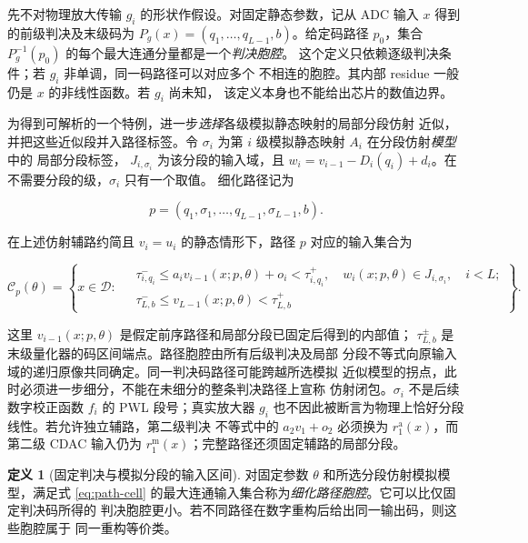 \documentclass[11pt,a4paper]{ctexart}
\theoremstyle{adcplain}
\theoremstyle{definition}
\newtheorem{definition}[proposition]{定义}
\begin{document}
先不对物理放大传输 $g_i$ 的形状作假设。对固定静态参数，记从 ADC 输入 $x$
得到的前级判决及末级码为 $P_g(x)=(q_1,\ldots,q_{L-1},b)$。给定码路径
$p_0$，集合 $P_g^{-1}(p_0)$ 的每个最大连通分量都是一个\emph{判决胞腔}。
这个定义只依赖逐级判决条件；若 $g_i$ 非单调，同一码路径可以对应多个
不相连的胞腔。其内部 residue 一般仍是 $x$ 的非线性函数。若 $g_i$ 尚未知，
该定义本身也不能给出芯片的数值边界。

为得到可解析的一个特例，进一步\emph{选择}各级模拟静态映射的局部分段仿射
近似，并把这些近似段并入路径标签。令
$\sigma_i$ 为第 $i$ 级模拟静态映射 $A_i$ 在分段仿射\emph{模型}中的
局部分段标签，
$J_{i,\sigma_i}$ 为该分段的输入域，且
$w_i=v_{i-1}-D_i(q_i)+d_i$。在不需要分段的级，$\sigma_i$ 只有一个取值。
细化路径记为

\begin{equation}
  p=(q_1,\sigma_1,\ldots,q_{L-1},\sigma_{L-1},b).
\end{equation}

在上述仿射辅路约简且 $v_i=u_i$ 的静态情形下，路径 $p$ 对应的输入集合为

\begin{equation}
  \mathcal C_p(\theta)
  =
  \left\{x\in\mathcal D:\;
  \begin{aligned}
    &\tau_{i,q_i}^{-}\le a_i v_{i-1}(x;p,\theta)+o_i
      <\tau_{i,q_i}^{+},\quad
      w_i(x;p,\theta)\in J_{i,\sigma_i},\quad i<L;\\
    &\tau_{L,b}^{-}\le v_{L-1}(x;p,\theta)<\tau_{L,b}^{+}
  \end{aligned}\right\}.
  \label{eq:path-cell}
\end{equation}

这里 $v_{i-1}(x;p,\theta)$ 是假定前序路径和局部分段已固定后得到的内部值；
$\tau_{L,b}^{\pm}$ 是末级量化器的码区间端点。路径胞腔由所有后级判决及局部
分段不等式向原输入域的递归原像共同确定。同一判决码路径可能跨越所选模拟
近似模型的拐点，此时必须进一步细分，不能在未细分的整条判决路径上宣称
仿射闭包。$\sigma_i$ 不是后续数字校正函数 $f_i$ 的 PWL 段号；真实放大器
$g_i$ 也不因此被断言为物理上恰好分段线性。若允许独立辅路，第二级判决
不等式中的 $a_2v_1+o_2$ 必须换为 $r_1^{\mathrm a}(x)$，而第二级 CDAC
输入仍为 $r_1^{\mathrm m}(x)$；完整路径还须固定辅路的局部分段。

\begin{definition}[固定判决与模拟分段的输入区间]
对固定参数 $\theta$ 和所选分段仿射模拟模型，满足式 \eqref{eq:path-cell}
的最大连通输入集合称为\emph{细化路径胞腔}。它可以比仅固定判决码所得的
判决胞腔更小。若不同路径在数字重构后给出同一输出码，则这些胞腔属于
同一重构等价类。
\end{definition}
\end{document}
